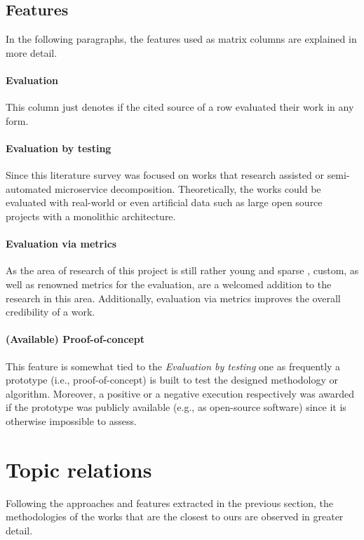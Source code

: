 \documentclass[12pt,a4paper]{report}
\begin{document}
\subsection*{Features}

In the following paragraphs, the features used as matrix columns are explained
in more detail.

\paragraph{Evaluation} This column just denotes if the cited
source of a row evaluated their work in any form.

\paragraph{Evaluation by testing}
Since this literature survey was focused on works that research
assisted or semi-automated microservice decomposition. Theoretically, the works
could be evaluated with real-world or even artificial data such as large open
source projects with a monolithic architecture.

\paragraph{Evaluation via metrics}
As the area of research of this project is still rather young and
sparse \cite{jin2018functionality, fritzsch2018monolith}, custom, as well
as renowned metrics for the evaluation, are a welcomed addition to the research
in this area. Additionally, evaluation via metrics improves the overall
credibility of a work. \paragraph{(Available) Proof-of-concept} This feature is
somewhat tied to the \textit{Evaluation by testing} one as frequently a
prototype (i.e., proof-of-concept) is built to test the designed methodology or
algorithm. Moreover, a positive or a negative execution respectively was
awarded if the prototype was publicly available (e.g., as open-source software)
since it is otherwise impossible to assess.



\section{Topic relations} \label{subsect:topic-relations}

Following the approaches and features extracted in the previous section, the
methodologies of the works that are the closest to ours are observed in greater
detail.
\end{document}
